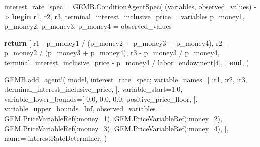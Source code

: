 \documentclass[
  letterpaper,
  DIV=11,
  numbers=noendperiod]{scrreprt}
\newenvironment{Shaded}{\begin{snugshade}}{\end{snugshade}}
\newcommand{\ConstantTok}[1]{\textcolor[rgb]{0.56,0.35,0.01}{#1}}
\newcommand{\ControlFlowTok}[1]{\textcolor[rgb]{0.00,0.23,0.31}{\textbf{#1}}}
\newcommand{\FloatTok}[1]{\textcolor[rgb]{0.68,0.00,0.00}{#1}}
\newcommand{\FunctionTok}[1]{\textcolor[rgb]{0.28,0.35,0.67}{#1}}
\newcommand{\NormalTok}[1]{\textcolor[rgb]{0.00,0.23,0.31}{#1}}
\newcommand{\OperatorTok}[1]{\textcolor[rgb]{0.37,0.37,0.37}{#1}}
\begin{document}
\begin{codelisting}
{\begin{Shaded}
\begin{Highlighting}[]
\NormalTok{interest\_rate\_spec }\OperatorTok{=}\NormalTok{ GEMB.}\FunctionTok{ConditionAgentSpec}\NormalTok{(}
\NormalTok{    (variables, observed\_values) }\OperatorTok{{-}\textgreater{}} \ControlFlowTok{begin}
\NormalTok{        r1, r2, r3, terminal\_interest\_inclusive\_price }\OperatorTok{=}\NormalTok{ variables}
\NormalTok{        p\_money1, p\_money2, p\_money3, p\_money4 }\OperatorTok{=}\NormalTok{ observed\_values}

        \ControlFlowTok{return}\NormalTok{ [}
\NormalTok{            r1 }\OperatorTok{{-}}\NormalTok{ p\_money1 }\OperatorTok{/}\NormalTok{ (p\_money2 }\OperatorTok{+}\NormalTok{ p\_money3 }\OperatorTok{+}\NormalTok{ p\_money4),}
\NormalTok{            r2 }\OperatorTok{{-}}\NormalTok{ p\_money2 }\OperatorTok{/}\NormalTok{ (p\_money3 }\OperatorTok{+}\NormalTok{ p\_money4),}
\NormalTok{            r3 }\OperatorTok{{-}}\NormalTok{ p\_money3 }\OperatorTok{/}\NormalTok{ p\_money4,}
\NormalTok{            terminal\_interest\_inclusive\_price }\OperatorTok{{-}}\NormalTok{ p\_money4 }\OperatorTok{/}\NormalTok{ labor\_endowment[}\FloatTok{4}\NormalTok{],}
\NormalTok{        ]}
    \ControlFlowTok{end}\NormalTok{,}
\NormalTok{)}

\NormalTok{GEMB.}\FunctionTok{add\_agent!}\NormalTok{(}
\NormalTok{    model,}
\NormalTok{    interest\_rate\_spec;}
\NormalTok{    variable\_names}\OperatorTok{=}\NormalTok{[}
        \OperatorTok{:}\NormalTok{r1,}
        \OperatorTok{:}\NormalTok{r2,}
        \OperatorTok{:}\NormalTok{r3,}
        \OperatorTok{:}\NormalTok{terminal\_interest\_inclusive\_price,}
\NormalTok{    ],}
\NormalTok{    variable\_start}\OperatorTok{=}\FloatTok{1.0}\NormalTok{,}
\NormalTok{    variable\_lower\_bounds}\OperatorTok{=}\NormalTok{[}
        \FloatTok{0.0}\NormalTok{,}
        \FloatTok{0.0}\NormalTok{,}
        \FloatTok{0.0}\NormalTok{,}
\NormalTok{        positive\_price\_floor,}
\NormalTok{    ],}
\NormalTok{    variable\_upper\_bounds}\OperatorTok{=}\ConstantTok{Inf}\NormalTok{,}
\NormalTok{    observed\_variables}\OperatorTok{=}\NormalTok{[}
\NormalTok{        GEM.}\FunctionTok{PriceVariableRef}\NormalTok{(}\OperatorTok{:}\NormalTok{money\_1),}
\NormalTok{        GEM.}\FunctionTok{PriceVariableRef}\NormalTok{(}\OperatorTok{:}\NormalTok{money\_2),}
\NormalTok{        GEM.}\FunctionTok{PriceVariableRef}\NormalTok{(}\OperatorTok{:}\NormalTok{money\_3),}
\NormalTok{        GEM.}\FunctionTok{PriceVariableRef}\NormalTok{(}\OperatorTok{:}\NormalTok{money\_4),}
\NormalTok{    ],}
\NormalTok{    name}\OperatorTok{=:}\NormalTok{interestRateDeterminer,}
\NormalTok{)}


\end{Highlighting}
\end{Shaded}}
\end{codelisting}
\end{document}
